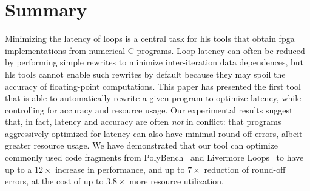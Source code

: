 \section{Summary}
\label{lo:sec:conclusion}

Minimizing the latency of loops is a central task for \gls{hls} tools that
obtain \gls{fpga} implementations from numerical C programs. Loop latency can
often be reduced by performing simple rewrites to minimize inter-iteration data
dependences, but \gls{hls} tools cannot enable such rewrites by default because
they may spoil the accuracy of floating-point computations. This paper has
presented the first tool that is able to automatically rewrite a given program
to optimize latency, while controlling for accuracy and resource usage. Our
experimental results suggest that, in fact, latency and accuracy are often
\emph{not} in conflict: that programs aggressively optimized for latency can
also have minimal round-off errors, albeit greater resource usage. We have
demonstrated that our tool can optimize commonly used code fragments from
PolyBench~\cite{polybench} and Livermore Loops~\cite{livermore} to have up to a
$12\times$ increase in performance, and up to $7\times$ reduction of round-off
errors, at the cost of up to $3.8\times$ more resource utilization.

